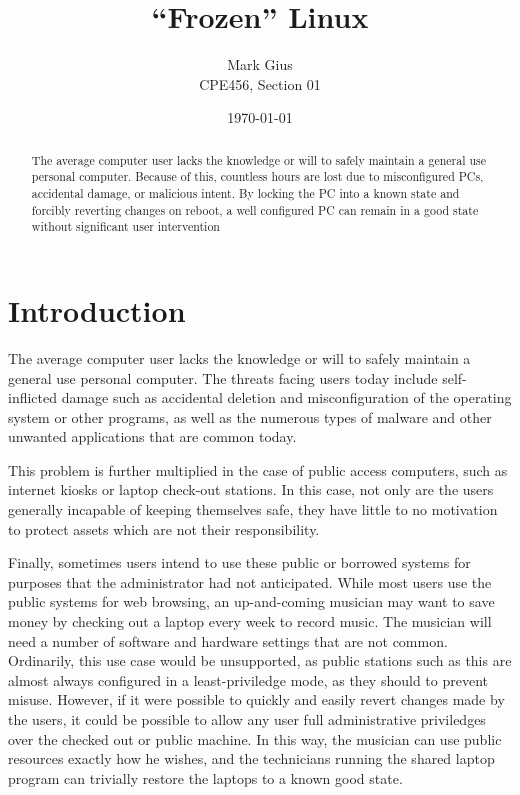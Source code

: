 \documentclass[12pt]{article}
\begin{document}
\title{``Frozen'' Linux}
\author{Mark Gius \\
        CPE456, Section 01}
\date{\today}
\maketitle

\begin{abstract}
The average computer user lacks the knowledge or will to safely maintain 
a general use personal computer.  Because of this, countless hours are lost
due to misconfigured PCs, accidental damage, or malicious intent.  By locking
the PC into a known state and forcibly reverting changes on reboot, a well
configured PC can remain in a good state without significant user intervention
\end{abstract}

\newpage
\doublespacing
\section{Introduction}
The average computer user lacks the knowledge or will to safely maintain 
a general use personal computer.  The threats facing users today include 
self-inflicted damage such as accidental deletion and misconfiguration of the 
operating system or other programs, as well as the numerous types of malware
and other unwanted applications that are common today.

This problem is further multiplied in the case of public access computers, 
such as internet kiosks or laptop check-out stations.  In this case, not 
only are the users generally incapable of keeping themselves safe, they have
little to no motivation to protect assets which are not their responsibility.

Finally, sometimes users intend to use these public or borrowed systems for
purposes that the administrator had not anticipated.  While most users 
use the public systems for web browsing, an up-and-coming musician may want
to save money by checking out a laptop every week to record music.  The 
musician will need a number of software and hardware settings that are not
common.  Ordinarily, this use case would be unsupported, as public stations
such as this are almost always configured in a least-priviledge mode, as 
they should to prevent misuse.  However, if it were possible to quickly
and easily revert changes made by the users, it could be possible to 
allow any user full administrative priviledges over the checked out or 
public machine.  In this way, the musician can use public resources exactly
how he wishes, and the technicians running the shared laptop program can
trivially restore the laptops to a known good state.
\end{document}

